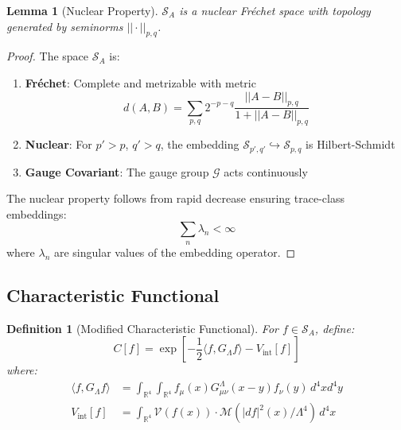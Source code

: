 \documentclass[12pt]{article}
\newcommand{\R}{\mathbb{R}}
\newtheorem{lemma}[theorem]{Lemma}
\newtheorem{definition}[theorem]{Definition}
\begin{document}
\begin{lemma}[Nuclear Property]
\label{lem:nuclear}
$\mathcal{S}_A$ is a nuclear Fréchet space with topology generated by seminorms $||\cdot||_{p,q}$.
\end{lemma}

\begin{proof}
The space $\mathcal{S}_A$ is:
\begin{enumerate}
\item \textbf{Fréchet}: Complete and metrizable with metric 
   \begin{equation}
   d(A,B) = \sum_{p,q} 2^{-p-q}\frac{||A-B||_{p,q}}{1+||A-B||_{p,q}}
   \end{equation}

\item \textbf{Nuclear}: For $p' > p$, $q' > q$, the embedding $\mathcal{S}_{p',q'} \hookrightarrow \mathcal{S}_{p,q}$ is Hilbert-Schmidt

\item \textbf{Gauge Covariant}: The gauge group $\mathcal{G}$ acts continuously
\end{enumerate}

The nuclear property follows from rapid decrease ensuring trace-class embeddings:
\begin{equation}
\sum_n \lambda_n < \infty
\end{equation}
where $\lambda_n$ are singular values of the embedding operator.
\end{proof}

\subsection{Characteristic Functional}

\begin{definition}[Modified Characteristic Functional]
\label{def:characteristic}
For $f \in \mathcal{S}_A$, define:
\begin{equation}
C[f] = \exp\left[-\frac{1}{2}\langle f, G_\Lambda f \rangle - V_{\text{int}}[f]\right]
\end{equation}
where:
\begin{align}
\langle f, G_\Lambda f \rangle &= \int_{\R^4} \int_{\R^4} f_\mu(x) G_{\mu\nu}^\Lambda(x-y) f_\nu(y) \, d^4x d^4y \\
V_{\text{int}}[f] &= \int_{\R^4} \mathcal{V}(f(x)) \cdot \mathcal{M}(|df|^2(x)/\Lambda^4) \, d^4x
\end{align}
\end{definition}
\end{document}
